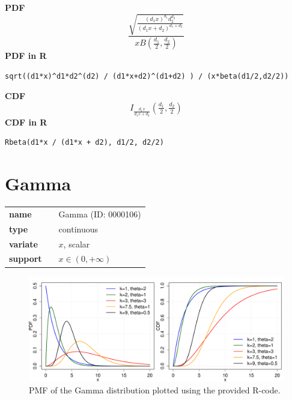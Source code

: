 \smallskip \noindent \hspace{.2cm} \textbf{PDF} 
\begin{equation*}\frac{\sqrt{\frac{(d_1 x)^{d_1}d_2^{d_2}}
{(d_1 x+d_2)^{d_1+d_2}}}}
{x B\left(\frac{d_1}{2},\frac{d_2}{2}\right)}\end{equation*}
\smallskip \noindent \hspace{.2cm} \textbf{PDF in R}  
\begin{verbatim}sqrt((d1*x)^d1*d2^(d2) / (d1*x+d2)^(d1+d2) ) / (x*beta(d1/2,d2/2))\end{verbatim}
\smallskip \noindent \hspace{.2cm} \textbf{CDF} 
\begin{equation*}I_{\frac{d_1 x}{d_1 x + d_2}} \left(\tfrac{d_1}{2}, \tfrac{d_2}{2} \right)\end{equation*}
\smallskip \noindent \hspace{.2cm} \textbf{CDF in R} 
\begin{verbatim}Rbeta(d1*x / (d1*x + d2), d1/2, d2/2)\end{verbatim}
\smallskip\section*{Gamma} 

  \bigskip 

\begin{tabular}{p{2cm}cl}
\textbf{name} & & Gamma (ID: 0000106)\\ 
 
\textbf{type} & & continuous \\ 

\textbf{variate} & & $x$, scalar \\ 

\textbf{support} & & $x \in (0,+\infty)$
\end{tabular}

\begin{figure}[ht!]
\centering
  \includegraphics[width=140mm]{pics/Gamma_pdf_cdf.pdf}
 \caption{PMF of the Gamma distribution plotted using the provided R-code.}
 \label{fig:Gamma_pdf_cdf}
\end{figure}

